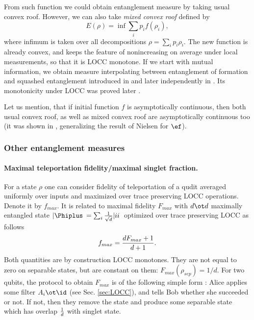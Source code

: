 \documentclass[twocolumn,aps,rmp]{revtex4}
\begin{document}
From such function we could obtain entanglement measure
by taking usual convex roof. However, we can also take {\it mixed
convex roof} defined by \begin{equation} E(\rho)=\inf \sum_ip_i f(\rho_i), \end{equation}
where infimum is taken over all decompositions $\rho=\sum_ip_i
\rho_i$. The new function is already convex, and keeps the feature of
nonincreasing on average under local measurements, so that it is
LOCC monotone. If we start with mutual information, we obtain
measure  interpolating between entanglement of formation and squashed entanglement
introduced in \cite{Tucci2002-squashed}
and later independently in \cite {NagelR2003-ent-mutual}. Its monotonicity under
LOCC was proved later \cite{multisquash}.


Let us mention, that if initial function $f$ is asymptotically
continuous, then both usual convex roof, as well as mixed convex
roof are asymptotically continuous  too (it was shown in
\cite{Synak05-asym}, generalizing the result of Nielsen
\cite{Nielsen-cont} for $\ef$).

\subsubsection{Other entanglement measures}
\label{subsubsec:other-measures}

\paragraph{Maximal teleportation fidelity/maximal singlet fraction.}
For a state $\rho$ one can consider fidelity of teleportation of a
qudit averaged uniformly over inputs and maximized over trace preserving LOCC operations.
Denote it by $f_{max}$. It is related to maximal fidelity $F_{max}$ with $d\ot d$
maximally entangled state $|\Phiplus\>=\sum_i{1\over \sqrt{d}}|ii\>$ optimized over trace preserving LOCC \cite{Rains1999} as follows
\cite{gentele}
\begin{equation}
f_{max}={dF_{max} +1 \over d+1}.
\end{equation}
Both quantities are
by construction LOCC monotones. They are not equal to zero on
separable states, but are constant on them: $F_{max}(\rho_{sep})=1/d$.
For two qubits, the protocol to obtain $F_{max}$ is of the following
simple form \cite{VerstraeteV2003-maxtel}: Alice applies some filter
$A_i\ot \id$ (see Sec. \ref{sec:LOCC}), and tells Bob whether  she
succeeded or not. If not, then they remove the state and produce
some separable state which has overlap $1\over d$ with singlet
state.
\end{document}
